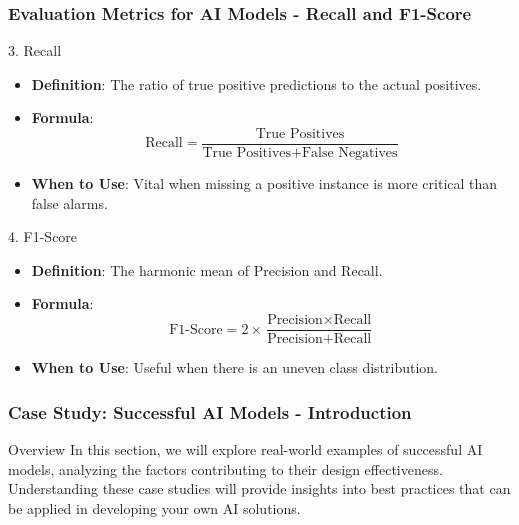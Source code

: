\documentclass[aspectratio=169]{beamer}
\begin{document}
\begin{frame}[fragile]
    \frametitle{Evaluation Metrics for AI Models - Recall and F1-Score}
    \begin{block}{3. Recall}
        \begin{itemize}
            \item \textbf{Definition}: The ratio of true positive predictions to the actual positives.
            \item \textbf{Formula}:  
            \begin{equation}
                \text{Recall} = \frac{\text{True Positives}}{\text{True Positives} + \text{False Negatives}}
            \end{equation}
            \item \textbf{When to Use}: Vital when missing a positive instance is more critical than false alarms.
        \end{itemize}
    \end{block}

    \begin{block}{4. F1-Score}
        \begin{itemize}
            \item \textbf{Definition}: The harmonic mean of Precision and Recall.
            \item \textbf{Formula}:  
            \begin{equation}
                \text{F1-Score} = 2 \times \frac{\text{Precision} \times \text{Recall}}{\text{Precision} + \text{Recall}}
            \end{equation}
            \item \textbf{When to Use}: Useful when there is an uneven class distribution.
        \end{itemize}
    \end{block}
\end{frame}

\begin{frame}[fragile]
    \frametitle{Case Study: Successful AI Models - Introduction}
    \begin{block}{Overview}
        In this section, we will explore real-world examples of successful AI models, analyzing the factors contributing to their design effectiveness. Understanding these case studies will provide insights into best practices that can be applied in developing your own AI solutions.
    \end{block}
\end{frame}
\end{document}
